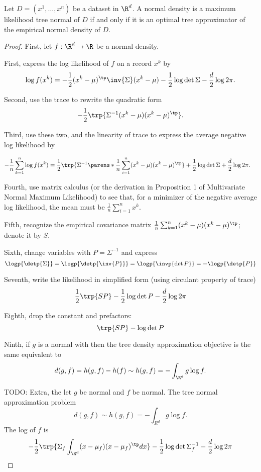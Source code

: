 \begin{prop}

Let $D = (x^1, \dots, x^n)$ be a dataset in $\R^d$.
A normal density is a maximum likelihood tree normal of $D$ if and only if it is an optimal tree approximator of the empirical normal density of $D$.

\begin{proof}

First, let $f: \R^d \to \R$ be a normal density.

First, express the log likelihood of $f$ on a record $x^k$ by
$$
  \log f(x^k) = - \frac{1}{2} (x^k - \mu)^{\tp} \inv{\Sigma} (x^k - \mu) - \frac{1}{2} \log \det \Sigma - \frac{d}{2}\log 2\pi.
$$

Second, use the trace to rewrite the quadratic form
$$
  -\frac{1}{2}\trp{\Sigma^{-1} (x^k - \mu) (x^k - \mu)^{\tp}}.
$$

Third, use these two, and the linearity of trace to express the average negative log likelihood by

$$
  \begin{aligned}
    - \frac{1}{n} \sum_{k = 1}^{n} \log f(x^k) &= \frac{1}{2} \trp{\Sigma^{-1}\parens*{\frac{1}{n}\sum_{i = 1}^{n} (x^k - \mu)(x^k - \mu)^{\tp}}} + \frac{1}{2}\log\det\Sigma + \frac{d}{2}\log 2\pi.
  \end{aligned}
$$

  Fourth, use matrix calculus (or the derivation in Proposition 1 of Multivariate Normal Maximum Likelihood) to see that, for a minimizer of the negative average log likelihood, the mean must be $\frac{1}{n} \sum_{i = 1}^{n} x^k$.

  Fifth, recognize the empirical covariance matrix $\frac{1}{n}\sum_{k = 1}^{n} (x^k - \mu)(x^k - \mu)^{\tp}$; denote it by $S$.

Sixth, change variables with $P = \Sigma^{-1}$ and express
$$
  \logp{\detp{\Sigma}} = \logp{\detp{\inv{P}}} = \logp{\invp{\det P}} = -\logp{\detp{P}}
$$

  Seventh, write the likelihood in simplified form (using circulant property of trace)
$$
  \frac{1}{2} \trp{SP} - \frac{1}{2} \log \det P - \frac{d}{2}\log 2\pi
$$

Eighth, drop the constant and prefactors:
$$
  \trp{SP} - \log \det P
$$

Ninth, if $g$ is a normal with then the tree density approximation objective is the same equivalent to
$$
  d(g, f) = h(g, f) - h(f) \sim h(g, f) = - \int_{\R^d} g\log f.
$$

TODO:
Extra, the let $g$ be normal and $f$ be normal. The tree normal approximation problem
$$
  d(g, f) \sim h(g, f) = - \int_{R^d} g \log f.
$$
The log of $f$ is
$$
  - \frac{1}{2} \trp{ \Sigma_f \int_{\R^d} (x - \mu_f)(x - \mu_f)^{\tp} dx } - \frac{1}{2} \log \det \Sigma_f^{-1} - \frac{d}{2} \log 2\pi
$$


\end{proof}
\end{prop}
